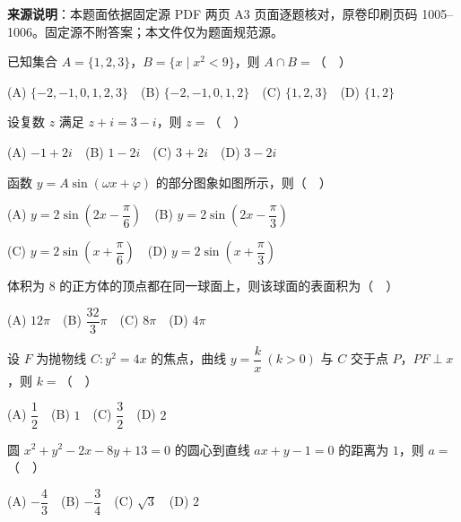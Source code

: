 


\begin{gktip}
\textbf{来源说明}：本题面依据固定源 PDF 两页 A3 页面逐题核对，原卷印刷页码 1005–1006。固定源不附答案；本文件仅为题面规范源。
\end{gktip}


\begin{question}
已知集合 $A=\{1,2,3\}$，$B=\{x\mid x^2<9\}$，则 $A\cap B=$（　）

   (A) $\{-2,-1,0,1,2,3\}$　(B) $\{-2,-1,0,1,2\}$　(C) $\{1,2,3\}$　(D) $\{1,2\}$

\end{question}
\begin{question}
设复数 $z$ 满足 $z+i=3-i$，则 $z=$（　）

   (A) $-1+2i$　(B) $1-2i$　(C) $3+2i$　(D) $3-2i$

\Needspace{0.4\textheight}
\end{question}
\begin{question}
函数 $y=A\sin(\omega x+\varphi)$ 的部分图象如图所示，则（　）
\nopagebreak[4]
\begin{center}\end{center}
\nopagebreak[4]
   (A) $y=2\sin\left(2x-\dfrac{\pi}{6}\right)$　(B) $y=2\sin\left(2x-\dfrac{\pi}{3}\right)$

   (C) $y=2\sin\left(x+\dfrac{\pi}{6}\right)$　(D) $y=2\sin\left(x+\dfrac{\pi}{3}\right)$

\end{question}
\begin{question}
体积为 $8$ 的正方体的顶点都在同一球面上，则该球面的表面积为（　）

   (A) $12\pi$　(B) $\dfrac{32}{3}\pi$　(C) $8\pi$　(D) $4\pi$

\end{question}
\begin{question}
设 $F$ 为抛物线 $C:y^2=4x$ 的焦点，曲线 $y=\dfrac{k}{x}\ (k>0)$ 与 $C$ 交于点 $P$，$PF\perp x$，则 $k=$（　）

   (A) $\dfrac12$　(B) $1$　(C) $\dfrac32$　(D) $2$

\end{question}
\begin{question}
圆 $x^2+y^2-2x-8y+13=0$ 的圆心到直线 $ax+y-1=0$ 的距离为 $1$，则 $a=$（　）

   (A) $-\dfrac43$　(B) $-\dfrac34$　(C) $\sqrt3$　(D) $2$

\Needspace{0.4\textheight}
\end{question}
